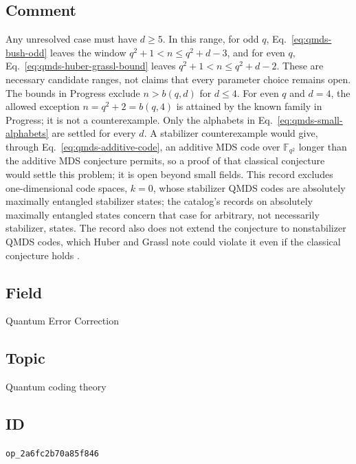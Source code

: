 \subsection*{Comment}

Any unresolved case must have $d\geq5$.  In this range, for odd $q$,
Eq.~\eqref{eq:qmds-bush-odd} leaves the window $q^{2}+1<n\leq q^{2}+d-3$, and
for even $q$, Eq.~\eqref{eq:qmds-huber-grassl-bound} leaves
$q^{2}+1<n\leq q^{2}+d-2$.  These are necessary candidate ranges, not
claims that every parameter choice remains open.  The bounds in Progress
exclude $n>b(q,d)$ for $d\leq4$.  For even $q$ and $d=4$, the allowed
exception $n=q^{2}+2=b(q,4)$ is attained by the known family in Progress;
it is not a counterexample.  Only the alphabets in
Eq.~\eqref{eq:qmds-small-alphabets} are settled for every $d$.
A stabilizer counterexample would give, through
Eq.~\eqref{eq:qmds-additive-code}, an additive MDS code over
$\mathbb{F}_{q^{2}}$ longer than the additive MDS conjecture permits, so a
proof of that classical conjecture would settle this problem; it is open
beyond small fields.  This record excludes one-dimensional code spaces,
$k=0$, whose stabilizer QMDS codes are absolutely maximally entangled
stabilizer states; the catalog's records on absolutely maximally entangled
states concern that case for arbitrary, not necessarily stabilizer,
states.  The record also does not extend the conjecture to nonstabilizer
QMDS codes, which Huber and Grassl note could violate it even if the
classical conjecture holds .

\subsection*{Field}

Quantum Error Correction

\subsection*{Topic}

Quantum coding theory

\subsection*{ID}

\texttt{op\_2a6fc2b70a85f846}
